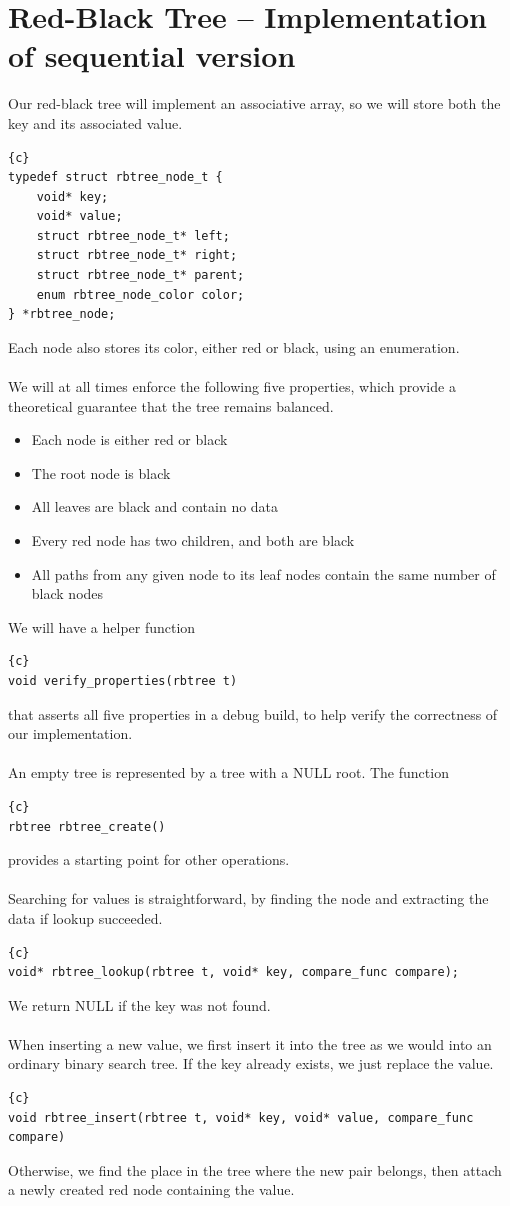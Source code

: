 \documentclass{article}
\newcommand{\enterProblemHeader}[1]{
}
\newcommand{\exitProblemHeader}[1]{
}
\newcounter{homeworkProblemCounter} %
\newcommand{\homeworkProblemName}{}
\newenvironment{homeworkProblem}[1][Problem \arabic{homeworkProblemCounter}]{ %
\stepcounter{homeworkProblemCounter} %
\renewcommand{\homeworkProblemName}{#1} %
\section{\homeworkProblemName} %
}{
}
\begin{document}

\begin{homeworkProblem}[Red-Black Tree – Implementation of sequential version]
Our red-black tree will implement an associative array, so we will store both the key 
and its associated value. 
\begin{lstlisting}{c}
typedef struct rbtree_node_t {
    void* key;
    void* value;
    struct rbtree_node_t* left;
    struct rbtree_node_t* right;
    struct rbtree_node_t* parent;
    enum rbtree_node_color color;
} *rbtree_node;
\end{lstlisting}
Each node also stores its color, either red or black, using an enumeration.
\\\\
We will at all times enforce the following five properties, which provide a theoretical 
guarantee that the tree remains balanced. 
\begin{itemize}
\item Each node is either red or black
\item The root node is black
\item All leaves are black and contain no data
\item Every red node has two children, and both are black
\item All paths from any given node to its leaf nodes contain the same number of black 
nodes
\end{itemize}
We will have a helper function
\begin{lstlisting}{c}
void verify_properties(rbtree t)
\end{lstlisting}
that asserts all five properties in a debug build, to help verify the correctness of 
our implementation.
\\\\
An empty tree is represented by a tree with a NULL root. The function 
\begin{lstlisting}{c}
rbtree rbtree_create()
\end{lstlisting}
provides a starting point for other operations.
\\\\
Searching for values is straightforward, by finding the node and extracting the data if 
lookup succeeded.
\begin{lstlisting}{c}
void* rbtree_lookup(rbtree t, void* key, compare_func compare);
\end{lstlisting}
We return NULL if the key was not found.
\\\\
When inserting a new value, we first insert it into the tree as we would into an 
ordinary binary search tree. If the key already exists, we just replace the value.
\begin{lstlisting}{c}
void rbtree_insert(rbtree t, void* key, void* value, compare_func compare)
\end{lstlisting}
Otherwise, we find the place in the tree where the new pair belongs, then attach a
newly created red node containing the value.


\end{homeworkProblem}
\end{document}
